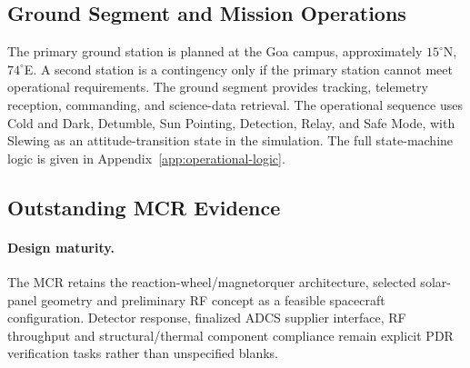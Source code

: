 

\subsection{Ground Segment and Mission Operations}\label{ground-segment-mission-operations}
The primary ground station is planned at the Goa campus, approximately $15^\circ$N, $74^\circ$E. A second station is a contingency only if the primary station cannot meet operational requirements. The ground segment provides tracking, telemetry reception, commanding, and science-data retrieval. The operational sequence uses Cold and Dark, Detumble, Sun Pointing, Detection, Relay, and Safe Mode, with Slewing as an attitude-transition state in the simulation. The full state-machine logic is given in Appendix~\ref{app:operational-logic}.



\subsection{Outstanding MCR Evidence}
\paragraph{Design maturity.} The MCR retains the reaction-wheel/magnetorquer architecture, selected solar-panel geometry and preliminary RF concept as a feasible spacecraft configuration. Detector response, finalized ADCS supplier interface, RF throughput and structural/thermal component compliance remain explicit PDR verification tasks rather than unspecified blanks.


